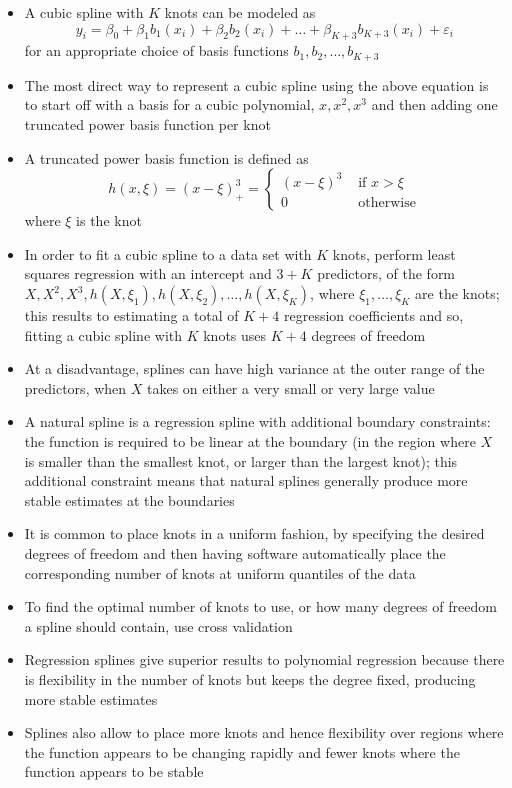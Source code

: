 \documentclass[12pt]{article}
\begin{document}
\begin{itemize}
\item A cubic spline with $K$ knots can be modeled as 
$$ y_i = \beta_0 + \beta_1b_1(x_i) + \beta_2b_2(x_i) + \dots + \beta_{K+3}b_{K+3}(x_i) + \varepsilon_i $$ for an appropriate choice of basis functions $b_1,b_2,\dots,b_{K+3}$
\item The most direct way to represent a cubic spline using the above equation is to start off with a basis for a cubic polynomial, $x,x^2,x^3$ and then adding one truncated power basis function per knot 
\item A truncated power basis function is defined as $$ h(x, \xi) = (x - \xi)^3_+ = \begin{cases} (x - \xi)^3 &\text{ if } x > \xi \\ 0 &\text{ otherwise} \end{cases} $$ where $\xi$ is the knot 
\item In order to fit a cubic spline to a data set with $K$ knots, perform least squares regression with an intercept and $3+K$ predictors, of the form $X,X^2,X^3,h(X,\xi_1), h(X,\xi_2),\dots,h(X,\xi_K)$, where $\xi_1,\dots,\xi_K$ are the knots; this results to estimating a total of $K+4$ regression coefficients and so, fitting a cubic spline with $K$ knots uses $K+4$ degrees of freedom
\item At a disadvantage, splines can have high variance at the outer range of the predictors, when $X$ takes on either a very small or very large value 
\item A natural spline is a regression spline with additional boundary constraints: the function is required to be linear at the boundary (in the region where $X$ is smaller than the smallest knot, or larger than the largest knot); this additional constraint means that natural splines generally produce more stable estimates at the boundaries
\item It is common to place knots in a uniform fashion, by specifying the desired degrees of freedom and then having software automatically place the corresponding number of knots at uniform quantiles of the data 
\item To find the optimal number of knots to use, or how many degrees of freedom a spline should contain, use cross validation
\item Regression splines give superior results to polynomial regression because there is flexibility in the number of knots but keeps the degree fixed, producing more stable estimates 
\item Splines also allow to place more knots and hence flexibility over regions where the function appears to be changing rapidly and fewer knots where the function appears to be stable 
\end{itemize}
\end{document}
